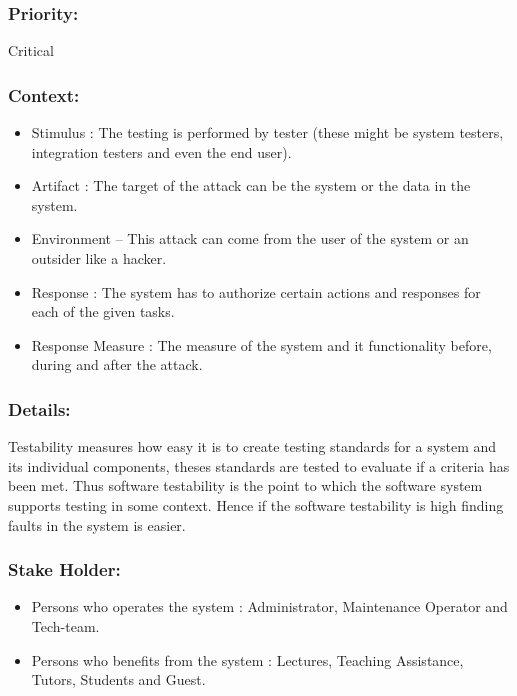 \documentclass[11pt]{article}
\begin{document}
		\subsubsection{Priority:}
			\textbf{} Critical

		\subsubsection{Context:}
		\begin{itemize}
			\item Stimulus : The testing is performed by tester (these might be system testers, integration testers and even the end user).
			\item Artifact : The target of the attack can be the system or the data in the system.
			\item Environment – This attack can come from the user of the system or an outsider like a hacker. 
			\item Response : The system has to authorize certain actions and responses for each of the given tasks.
			\item Response Measure : The measure of the system and it functionality before, during and after the attack.
		\end{itemize}
		
		\subsubsection{Details:}
			\textbf{}Testability measures how easy it is to create testing standards for a system and its individual components, theses standards are tested to evaluate if a criteria has been met. Thus software testability is the point to which the software system supports testing in some context. Hence if the software testability is high finding faults in the system is easier.
		
		\subsubsection{Stake Holder:}
		\begin{itemize}
			\item Persons who operates the system : Administrator, Maintenance Operator and Tech-team.
			\item Persons who benefits from the system : Lectures, Teaching Assistance, Tutors, Students and Guest.
			\end{itemize}		
		
\end{document}
